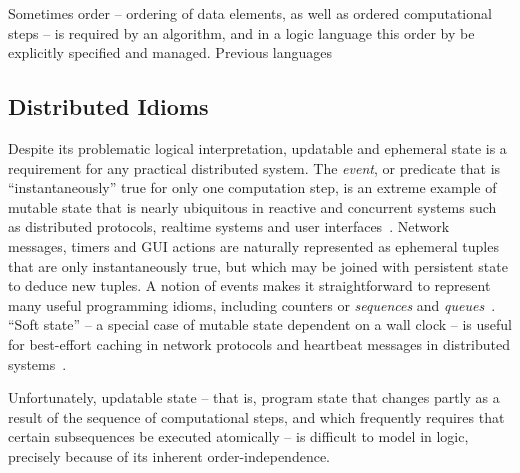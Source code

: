 Sometimes order -- ordering of data elements, as well as ordered computational steps -- 
is required by an algorithm, and in a logic language this order by be explicitly specified and 
managed.  Previous languages 


\subsection{Distributed Idioms}

Despite its problematic logical interpretation, updatable and ephemeral state is a requirement
for any practical distributed system.  The \emph{event}, or predicate that is ``instantaneously''
true for only one computation step, is an extreme example of mutable state that is nearly
ubiquitous in reactive and concurrent systems such as distributed protocols, realtime systems
and user interfaces~\cite{prologevents}.
Network messages, timers and GUI actions are
naturally represented as ephemeral tuples that are only instantaneously true, 
but which may be joined with persistent state to deduce new
tuples.  A notion of events makes it straightforward to represent many useful
programming idioms, including counters or \emph{sequences} and
\emph{queues}~\cite{netdb}.
``Soft state'' -- a special case of mutable state dependent on a wall clock -- 
is  useful for best-effort
caching in network protocols and heartbeat messages in distributed
systems~\cite{boom-eurosys}.  

Unfortunately, updatable state -- that is, program state that changes partly as a result of the 
sequence of computational steps, and which frequently requires that certain subsequences be executed atomically -- is difficult to model in logic, precisely because of its inherent order-independence.  


